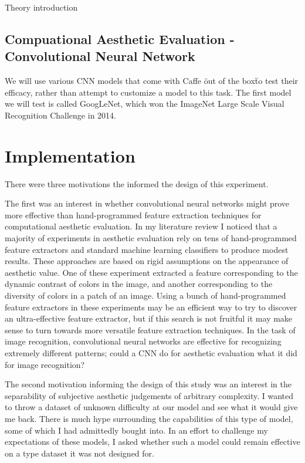 \documentclass[midd]{thesis}
\begin{document}
Theory introduction

\section{Compuational Aesthetic Evaluation - Convolutional Neural Network}

We will use various CNN models that come with Caffe \"out of the box\" to test their efficacy, rather than attempt to customize a model to this task. The first model we will test is called GoogLeNet, which won the ImageNet Large Scale Visual Recognition Challenge in 2014.

\chapter{Implementation}

There were three motivations the informed the design of this experiment.

The first was an interest in whether convolutional neural networks might prove more effective than hand-programmed feature extraction techniques for computational aesthetic evaluation. In my literature review I noticed that a majority of experiments in aesthetic evaluation rely on tens of hand-programmed feature extractors and standard machine learning classifiers to produce modest results. These approaches are based on rigid assumptions on the appearance of aesthetic value. One of these experiment extracted a feature corresponding to the dynamic contrast of colors in the image, and another corresponding to the diversity of colors in a patch of an image. Using a bunch of hand-programmed feature extractors in these experiments may be an efficient way to try to discover an ultra-effective feature extractor, but if this search is not fruitful it may make sense to turn towards more versatile feature extraction techniques. In the task of image recognition, convolutional neural networks are effective for recognizing extremely different patterns; could a CNN do for aesthetic evaluation what it did for image recognition?

The second motivation informing the design of this study was an interest in the separability of subjective aesthetic judgements of arbitrary complexity. I wanted to throw a dataset of unknown difficulty at our model and see what it would give me back. There is much hype surrounding the capabilities of this type of model, some of which I had admittedly bought into. In an effort to challenge my expectations of these models, I asked whether such a model could remain effective on a type dataset it was not designed for.
\end{document}
